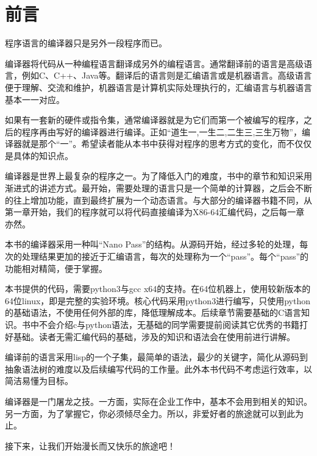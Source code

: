 \chapter{前言}

程序语言的编译器只是另外一段程序而已。

编译器将代码从一种编程语言翻译成另外的编程语言。通常翻译前的语言是高级语言，例如C、C++、Java等。翻译后的语言则是汇编语言或是机器语言。高级语言便于理解、交流和维护，机器语言是计算机实际处理执行的，汇编语言与机器语言基本一一对应。

如果有一套新的硬件或指令集，通常编译器就是为它们而第一个被编写的程序，之后的程序再由写好的编译器进行编译。正如“道生一,一生二,二生三,三生万物”，编译器就是那个“一”。希望读者能从本书中获得对程序的思考方式的变化，而不仅仅是具体的知识点。

编译器是世界上最复杂的程序之一。为了降低入门的难度，书中的章节和知识采用渐进式的讲述方式。最开始，需要处理的语言只是一个简单的计算器，之后会不断的往上增加功能，直到最终扩展为一个动态语言。与大部分的编译器书籍不同，从第一章开始，我们的程序就可以将代码直接编译为X86-64汇编代码，之后每一章亦然。

本书的编译器采用一种叫“Nano Pass”的结构。从源码开始，经过多轮的处理，每次的处理结果更加的接近于汇编语言，每次的处理称为一个“pass”。每个“pass”的功能相对精简，便于掌握。

本书提供的代码，需要python3与gcc x64的支持。在64位机器上，使用较新版本的64位linux，即是完整的实验环境。核心代码采用python3进行编写，只使用python的基础语法，不使用任何外部的库，降低理解成本。后续章节需要基础的C语言知识。书中不会介绍c与python语法，无基础的同学需要提前阅读其它优秀的书籍打好基础。读者无需汇编代码的基础，涉及的知识和语法会在使用前进行讲解。

编译前的语言采用lisp的一个子集，最简单的语法，最少的关键字，简化从源码到抽象语法树的难度以及后续编写代码的工作量。此外本书代码不考虑运行效率，以简洁易懂为目标。

编译器是一门屠龙之技。一方面，实际在企业工作中，基本不会用到相关的知识。另一方面，为了掌握它，你必须倾尽全力。所以，非爱好者的旅途就可以到此为止。

接下来，让我们开始漫长而又快乐的旅途吧！

